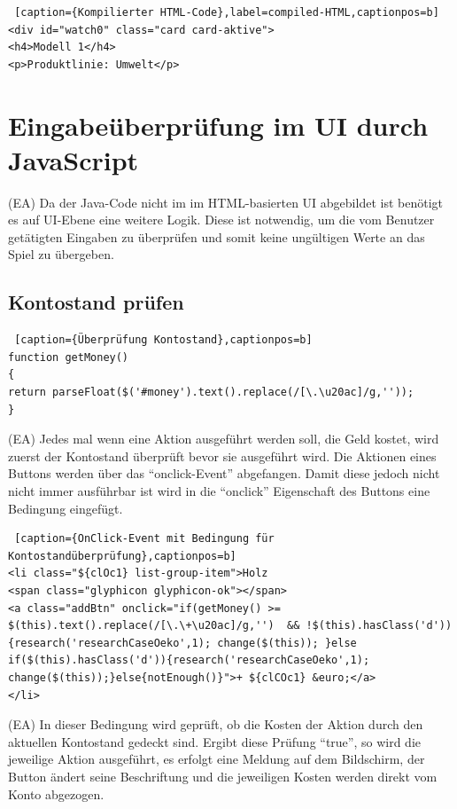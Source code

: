 \lstset{language=HTML}
\begin{lstlisting} [caption={Kompilierter HTML-Code},label=compiled-HTML,captionpos=b]
<div id="watch0" class="card card-aktive">
<h4>Modell 1</h4>
<p>Produktlinie: Umwelt</p>
\end{lstlisting} 

\section{Eingabeüberprüfung im UI durch JavaScript}
(EA) Da der Java-Code nicht im im HTML-basierten UI abgebildet ist benötigt es auf UI-Ebene eine weitere Logik. Diese ist notwendig, um die vom Benutzer getätigten Eingaben zu überprüfen und somit keine ungültigen Werte an das Spiel zu übergeben. 

\subsection*{Kontostand prüfen}

\lstset{language=Java}
\begin{lstlisting} [caption={Überprüfung Kontostand},captionpos=b]
function getMoney()
{
return parseFloat($('#money').text().replace(/[\.\u20ac]/g,''));
}
\end{lstlisting}

(EA) Jedes mal wenn eine Aktion ausgeführt werden soll, die Geld kostet, wird zuerst der Kontostand überprüft bevor sie ausgeführt wird. Die Aktionen eines Buttons werden über das \enquote{onclick-Event} abgefangen. Damit diese jedoch nicht nicht immer ausführbar ist wird in die \enquote{onclick} Eigenschaft des Buttons eine Bedingung eingefügt. 

\lstset{language=HTML}
\begin{lstlisting} [caption={OnClick-Event mit Bedingung für Kontostandüberprüfung},captionpos=b]
<li class="${clOc1} list-group-item">Holz 
<span class="glyphicon glyphicon-ok"></span>
<a class="addBtn" onclick="if(getMoney() >= $(this).text().replace(/[\.\+\u20ac]/g,'')  && !$(this).hasClass('d')){research('researchCaseOeko',1); change($(this)); }else if($(this).hasClass('d')){research('researchCaseOeko',1); change($(this));}else{notEnough()}">+ ${clCOc1} &euro;</a>
</li>
\end{lstlisting}

(EA) In dieser Bedingung wird geprüft, ob die Kosten der Aktion durch den aktuellen Kontostand gedeckt sind. Ergibt diese Prüfung \enquote{true}, so wird die jeweilige Aktion ausgeführt, es erfolgt eine Meldung auf dem Bildschirm, der Button ändert seine Beschriftung und die jeweiligen Kosten werden direkt vom Konto abgezogen.

